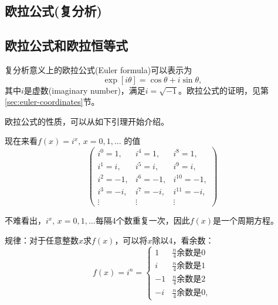 \begin{subappendices}

\section{欧拉公式(复分析)}
\label{sec:euler-complex}

\subsection{欧拉公式和欧拉恒等式}
\label{sec:euler-complex-formula-identityt}

复分析意义上的欧拉公式(Euler formula)可以表示为
\begin{equation}
  \label{eq:euler-complex-def}
  \exp \left[ i \theta \right] = \cos \theta + i \sin \theta,
\end{equation}
其中$i$是虚数(imaginary number)，满足$i = \sqrt{-1}$。欧拉公式的证明，见第\ref{sec:euler-coordinates}节。

欧拉公式的性质，可以从如下引理开始介绍。
\begin{lemma}[$i$的幂是周期方程]
  \label{lemma:i-power-cyclical}
  现在来看$f(x)=i^{x}, \, x=0,1,\ldots$ 的值
  \begin{equation*}
    \begin{pmatrix}
      i^{0}=1, & i^{4}=1, & i^{8}=1, \\
      i^{1}=i, & i^{5}=i, & i^{9}=i, \\
      i^{2}=-1, & i^{6}=-1, & i^{10}=-1, \\
      i^{3}=-i, & i^{7}=-i, & i^{11}=-i, \\
      \vdots & \vdots & \vdots
    \end{pmatrix}
  \end{equation*}
\end{lemma}
不难看出，$i^{x}, \, x=0,1,\ldots$每隔4个数重复一次，因此$f(x)$是一个周期方程。

规律：对于任意整数$x$求$f(x)$，可以将$x$除以$4$，看余数：
\begin{equation*}
  f(x) = i^{n} =
  \begin{cases}
    1 & \text{$\frac{n}{4}$余数是0} \\
    i & \text{$\frac{n}{4}$余数是1} \\
    -1 & \text{$\frac{n}{4}$余数是2} \\
    -i & \text{$\frac{n}{4}$余数是0},
  \end{cases}
\end{equation*}


\end{subappendices}
